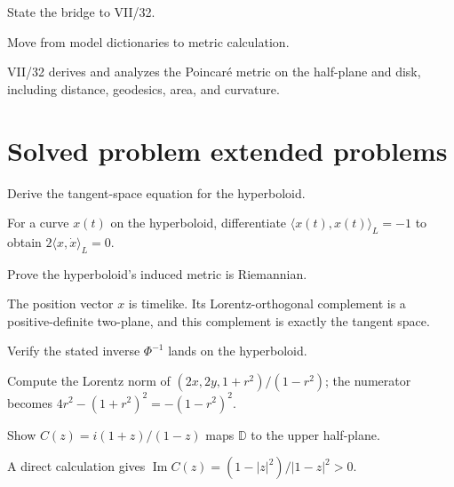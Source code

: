 \begin{exercise}\label{exr:vii31-24}
State the bridge to VII/32.
\end{exercise}
\begin{hint}
Move from model dictionaries to metric calculation.
\end{hint}
\begin{solution}
VII/32 derives and analyzes the Poincaré metric on the half-plane and disk, including distance, geodesics, area, and curvature.
\end{solution}

\section{Solved problem extended problems}
\begin{problem}\label{prob:vii31-01}
Derive the tangent-space equation for the hyperboloid.
\end{problem}
\begin{solution}
For a curve \(x(t)\) on the hyperboloid, differentiate \(\langle x(t),x(t)\rangle_L=-1\) to obtain \(2\langle x,\dot x\rangle_L=0\).
\end{solution}

\begin{problem}\label{prob:vii31-02}
Prove the hyperboloid's induced metric is Riemannian.
\end{problem}
\begin{solution}
The position vector \(x\) is timelike. Its Lorentz-orthogonal complement is a positive-definite two-plane, and this complement is exactly the tangent space.
\end{solution}

\begin{problem}\label{prob:vii31-03}
Verify the stated inverse \(\Phi^{-1}\) lands on the hyperboloid.
\end{problem}
\begin{solution}
Compute the Lorentz norm of \((2x,2y,1+r^2)/(1-r^2)\); the numerator becomes \(4r^2-(1+r^2)^2=-(1-r^2)^2\).
\end{solution}

\begin{problem}\label{prob:vii31-04}
Show \(C(z)=i(1+z)/(1-z)\) maps \(\mathbb D\) to the upper half-plane.
\end{problem}
\begin{solution}
A direct calculation gives \(\operatorname{Im}C(z)=(1-|z|^2)/|1-z|^2>0\).
\end{solution}

